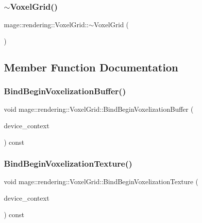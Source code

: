 \subsubsection{\texorpdfstring{$\sim$\+Voxel\+Grid()}{~VoxelGrid()}}
{\footnotesize\ttfamily mage\+::rendering\+::\+Voxel\+Grid\+::$\sim$\+Voxel\+Grid (\begin{DoxyParamCaption}{ }\end{DoxyParamCaption})\hspace{0.3cm}{\ttfamily [default]}}



\subsection{Member Function Documentation}
\hypertarget{classmage_1_1rendering_1_1_voxel_grid_a52254c5709b77d6c348eb15b782b5bc4}{}\label{classmage_1_1rendering_1_1_voxel_grid_a52254c5709b77d6c348eb15b782b5bc4} 
\subsubsection{\texorpdfstring{Bind\+Begin\+Voxelization\+Buffer()}{BindBeginVoxelizationBuffer()}}
{\footnotesize\ttfamily void mage\+::rendering\+::\+Voxel\+Grid\+::\+Bind\+Begin\+Voxelization\+Buffer (\begin{DoxyParamCaption}\item[{I\+D3\+D11\+Device\+Context \&}]{device\+\_\+context }\end{DoxyParamCaption}) const\hspace{0.3cm}{\ttfamily [noexcept]}}

\hypertarget{classmage_1_1rendering_1_1_voxel_grid_a00fa75aaed950df37be237c9b8557eeb}{}\label{classmage_1_1rendering_1_1_voxel_grid_a00fa75aaed950df37be237c9b8557eeb} 
\subsubsection{\texorpdfstring{Bind\+Begin\+Voxelization\+Texture()}{BindBeginVoxelizationTexture()}}
{\footnotesize\ttfamily void mage\+::rendering\+::\+Voxel\+Grid\+::\+Bind\+Begin\+Voxelization\+Texture (\begin{DoxyParamCaption}\item[{I\+D3\+D11\+Device\+Context \&}]{device\+\_\+context }\end{DoxyParamCaption}) const\hspace{0.3cm}{\ttfamily [noexcept]}}

